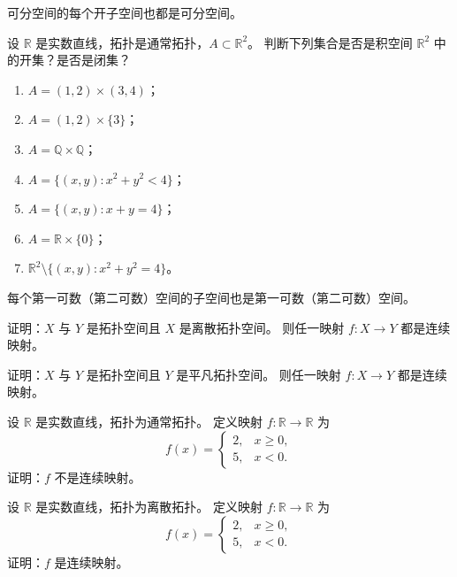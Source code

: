 \begin{homework}[2.1]
可分空间的每个开子空间也都是可分空间。
\end{homework}

\begin{homework}[13]
设 $\mathbb{R}$ 是实数直线，拓扑是通常拓扑，$A\subset \mathbb{R}^2$。  
判断下列集合是否是积空间 $\mathbb{R}^2$ 中的开集？是否是闭集？
\begin{enumerate}[(1)]
  \item $A = (1,2)\times(3,4)$；
  \item $A = (1,2)\times\{3\}$；
  \item $A = \mathbb{Q}\times\mathbb{Q}$；
  \item $A = \{(x,y): x^2+y^2<4\}$；
  \item $A = \{(x,y): x+y=4\}$；
  \item $A = \mathbb{R}\times\{0\}$；
  \item $\mathbb{R}^2\setminus\{(x,y):x^2+y^2=4\}$。
\end{enumerate}
\end{homework}

\begin{homework}[2.2]
每个第一可数（第二可数）空间的子空间也是第一可数（第二可数）空间。
\end{homework}

\begin{homework}[1]
证明：\(X\) 与 \(Y\) 是拓扑空间且 \(X\) 是离散拓扑空间。  
则任一映射 \(f:X\to Y\) 都是连续映射。
\end{homework}

\begin{homework}[2]
证明：\(X\) 与 \(Y\) 是拓扑空间且 \(Y\) 是平凡拓扑空间。  
则任一映射 \(f:X\to Y\) 都是连续映射。
\end{homework}

\begin{homework}[5]
设 \(\mathbb{R}\) 是实数直线，拓扑为通常拓扑。  
定义映射 \(f:\mathbb{R}\to\mathbb{R}\) 为
\[
f(x)=
\begin{cases}
2, & x\ge0,\\
5, & x<0.
\end{cases}
\]
证明：\(f\) 不是连续映射。
\end{homework}

\begin{homework}[6]
设 \(\mathbb{R}\) 是实数直线，拓扑为离散拓扑。  
定义映射 \(f:\mathbb{R}\to\mathbb{R}\) 为
\[
f(x)=
\begin{cases}
2, & x\ge0,\\
5, & x<0.
\end{cases}
\]
证明：\(f\) 是连续映射。
\end{homework}

